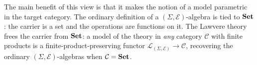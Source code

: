 The main benefit of this view is that it makes the notion of a model
parametric in the target category. The ordinary definition of a
$(\Sigma,\mathcal{E})$-algebra is tied to $\mathbf{Set}$: the carrier is
a set and the operations are functions on it. The Lawvere theory frees
the carrier from $\mathbf{Set}$: a model of the theory in \emph{any}
category $\mathcal{C}$ with finite products is a
finite-product-preserving functor $\mathcal{L}_{(\Sigma,\mathcal{E})} \to
\mathcal{C}$, recovering the ordinary $(\Sigma,\mathcal{E})$-algebras when
$\mathcal{C} = \mathbf{Set}$.



